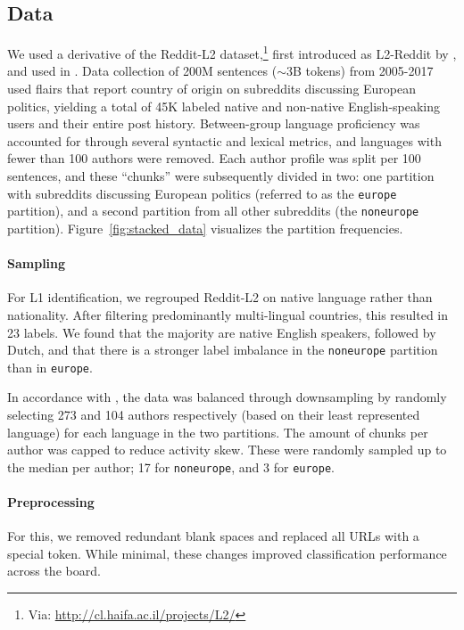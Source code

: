 \documentclass[10pt, a4paper]{article}
\begin{document}
\subsection{Data} \label{sec:dataset}

We used a derivative of the Reddit-L2 dataset,\footnote{Via: \url{http://cl.haifa.ac.il/projects/L2/}} first introduced as L2-Reddit by , and used in . Data collection of 200M sentences ($\sim$3B tokens) from 2005-2017 used flairs that report country of origin on subreddits discussing European politics, yielding a total of 45K labeled native and non-native English-speaking users and their entire post history. Between-group language proficiency was accounted for through several syntactic and lexical metrics, and languages with fewer than 100 authors were removed. Each author profile was split per 100 sentences, and these ``chunks'' were subsequently divided in two: one partition with subreddits discussing European politics (referred to as the \texttt{europe} partition), and a second partition from all other subreddits (the \texttt{non\textunderscore europe} partition). Figure~\ref{fig:stacked_data} visualizes the partition frequencies. 

\paragraph{Sampling} For L1 identification, we regrouped Reddit-L2 on native language rather than nationality. After filtering predominantly multi-lingual countries, this resulted in 23 labels. We found that the majority are native English speakers, followed by Dutch, and that there is a stronger label imbalance in the \texttt{non\textunderscore europe} partition than in \texttt{europe}. 

In accordance with , the data was balanced through downsampling by randomly selecting 273 and 104 authors respectively (based on their least represented language) for each language in the two partitions. The amount of chunks per author was capped to reduce activity skew. These were randomly sampled up to the median per author; 17 for \texttt{non\textunderscore europe}, and 3 for \texttt{europe}. 

\paragraph{Preprocessing} \label{sec:preprocessing} For this, we removed redundant blank spaces and replaced all URLs with a special token. While minimal, these changes improved classification performance across the board. 
\end{document}

